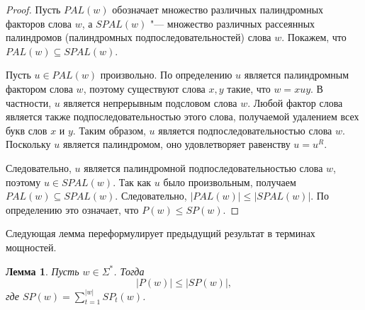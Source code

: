 \documentclass[a4paper,14pt]{extreport}
\theoremstyle{plain}
\newtheorem{lemma}{Лемма}[section]
\theoremstyle{definition}
\theoremstyle{remark}
\begin{document}
\begin{proof}
	Пусть $PAL(w)$ обозначает множество различных палиндромных факторов слова $w$, а $SPAL(w)$ "--- множество различных рассеянных палиндромов (палиндромных подпоследовательностей) слова $w$. Покажем, что $PAL(w) \subseteq SPAL(w)$.
	
	Пусть $u \in PAL(w)$ произвольно. По определению $u$ является палиндромным фактором слова $w$, поэтому существуют слова $x,y$ такие, что $w = xuy$. В частности, $u$ является непрерывным подсловом слова $w$. Любой фактор слова является также подпоследовательностью этого слова, получаемой удалением всех букв слов $x$ и $y$. Таким образом, $u$ является подпоследовательностью слова $w$. Поскольку $u$ является палиндромом, оно удовлетворяет равенству $u = u^R$.
	
	Следовательно, $u$ является палиндромной подпоследовательностью слова $w$, поэтому $u \in SPAL(w)$. Так как $u$ было произвольным, получаем $PAL(w) \subseteq SPAL(w)$.
	Следовательно, $|PAL(w)| \leq |SPAL(w)|$. По определению это означает, что $P(w) \leq SP(w)$.
\end{proof}

Следующая лемма переформулирует предыдущий результат в терминах мощностей.

\begin{lemma}\label{pal_spal}
	Пусть $w \in \Sigma^*$. Тогда
	\begin{equation}
		|P(w)| \leq |SP(w)|,
	\end{equation}
	где $SP(w)=\sum_{t=1}^{|w|} SP_t(w)$.
\end{lemma}
\end{document}
